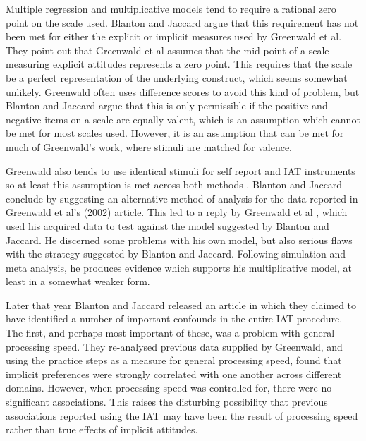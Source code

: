 Multiple regression and multiplicative models tend to require a rational zero point on the scale used. Blanton and Jaccard argue that this requirement has not been met for either the explicit or implicit measures used by Greenwald et al. They point out that Greenwald et al \cite{greenwald2002} assumes that the mid point of a scale measuring explicit attitudes represents a zero point. This requires that the scale be a perfect representation of the underlying construct, which seems somewhat unlikely. Greenwald often uses difference scores to avoid this kind of problem, but Blanton and Jaccard argue that this is only permissible if the positive and negative items on a scale are equally valent, which is an assumption which cannot be met for most scales used. However, it is an assumption that can be met for much of Greenwald's work, where stimuli are matched for valence. 

Greenwald also tends to use identical stimuli for self report and IAT instruments so at least this assumption is met across both methods \cite{Farnham1999,Greenwald1998}. Blanton and Jaccard conclude by suggesting an alternative method of analysis for the data reported in Greenwald et al's (2002) article. This led to a reply by Greenwald et al \cite{Greenwald2006b}, which used his acquired data to test against the model suggested by Blanton and Jaccard. He discerned some problems with his own model, but also serious flaws with the strategy suggested by Blanton and Jaccard. Following simulation and meta analysis, he produces evidence which supports his multiplicative model, at least in a somewhat weaker form. 



Later that year Blanton and Jaccard released an article \cite{Blanton2006} in which they claimed to have identified a number of important confounds in the entire IAT procedure. The first, and perhaps most important of these, was a problem with general processing speed. They re-analysed previous data supplied by Greenwald, and using the practice steps as a measure for general processing speed, found that implicit preferences were strongly correlated with one another across different domains. However, when processing speed was controlled for, there were no significant associations. This raises the disturbing possibility that previous associations reported using the IAT may have been the result of processing speed rather than true effects of implicit attitudes.

